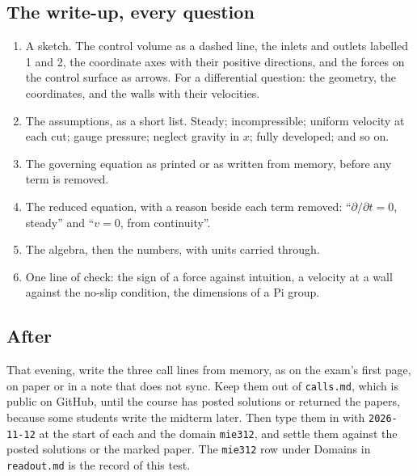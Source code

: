 \subsection*{The write-up, every question}

\begin{enumerate}[nosep,leftmargin=*]
\item A sketch. The control volume as a dashed line, the inlets and outlets labelled 1 and 2, the coordinate axes with their positive directions, and the forces on the control surface as arrows. For a differential question: the geometry, the coordinates, and the walls with their velocities.
\item The assumptions, as a short list. Steady; incompressible; uniform velocity at each cut; gauge pressure; neglect gravity in $x$; fully developed; and so on.
\item The governing equation as printed or as written from memory, before any term is removed.
\item The reduced equation, with a reason beside each term removed: ``$\partial/\partial t = 0$, steady'' and ``$v = 0$, from continuity''.
\item The algebra, then the numbers, with units carried through.
\item One line of check: the sign of a force against intuition, a velocity at a wall against the no-slip condition, the dimensions of a Pi group.
\end{enumerate}

\subsection*{After}

That evening, write the three call lines from memory, as on the exam's first page, on paper or in a note that does not sync. Keep them out of \texttt{calls.md}, which is public on GitHub, until the course has posted solutions or returned the papers, because some students write the midterm later. Then type them in with \texttt{2026-11-12} at the start of each and the domain \texttt{mie312}, and settle them against the posted solutions or the marked paper. The \texttt{mie312} row under Domains in \texttt{readout.md} is the record of this test.
